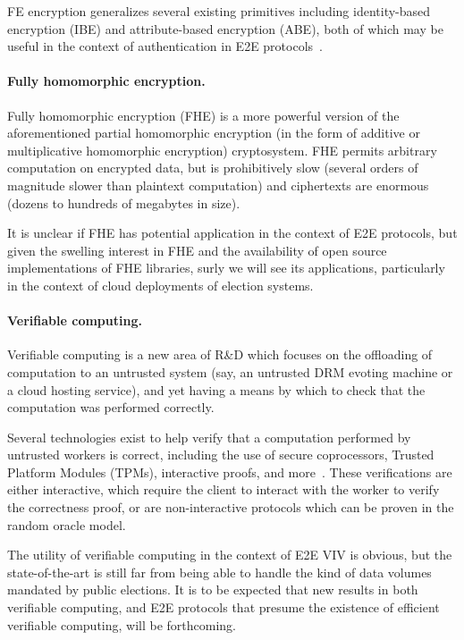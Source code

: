 FE encryption generalizes several existing primitives including
identity-based encryption (IBE) and attribute-based encryption (ABE),
both of which may be useful in the context of authentication in E2E
protocols~\cite{IBE,ABE}.

\paragraph{Fully homomorphic encryption.} Fully homomorphic encryption
(FHE) is a more powerful version of the aforementioned partial
homomorphic encryption (in the form of additive or multiplicative
homomorphic encryption) cryptosystem.  FHE permits arbitrary
computation on encrypted data, but is prohibitively slow (several
orders of magnitude slower than plaintext computation) and ciphertexts
are enormous (dozens to hundreds of megabytes in size).  

It is unclear if FHE has potential application in the context of E2E
protocols, but given the swelling interest in FHE and the availability
of open source implementations of FHE libraries, surly we will see its
applications, particularly in the context of cloud deployments of
election systems.

\paragraph{Verifiable computing.} Verifiable computing is a new area
of R\&D which focuses on the offloading of computation to an untrusted
system (say, an untrusted DRM evoting machine or a cloud hosting
service), and yet having a means by which to check that the
computation was performed correctly.

Several technologies exist to help verify that a computation performed
by untrusted workers is correct, including the use of secure
coprocessors, Trusted Platform Modules (TPMs), interactive proofs, and
more~\cite{TPM-stuff}. These verifications are either interactive,
which require the client to interact with the worker to verify the
correctness proof, or are non-interactive protocols which can be
proven in the random oracle model.

The utility of verifiable computing in the context of E2E VIV is
obvious, but the state-of-the-art is still far from being able to
handle the kind of data volumes mandated by public elections. It is to
be expected that new results in both verifiable computing, and E2E
protocols that presume the existence of efficient verifiable
computing, will be forthcoming.

